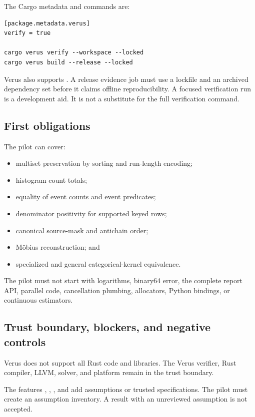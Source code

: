 \documentclass[11pt]{article}
\begin{document}
The Cargo metadata and commands are:

\begin{lstlisting}
[package.metadata.verus]
verify = true

cargo verus verify --workspace --locked
cargo verus build --release --locked
\end{lstlisting}

Verus also supports .  A release evidence job must use a lockfile and an archived
dependency set before it claims offline reproducibility.  A focused verification run is a
development aid.  It is not a substitute for the full verification command.

\subsection{First obligations}

The pilot can cover:
\begin{itemize}[leftmargin=*]
  \item multiset preservation by sorting and run-length encoding;
  \item histogram count totals;
  \item equality of event counts and event predicates;
  \item denominator positivity for supported keyed rows;
  \item canonical source-mask and antichain order;
  \item M{\"o}bius reconstruction; and
  \item specialized and general categorical-kernel equivalence.
\end{itemize}

The pilot must not start with logarithms, binary64 error, the complete report API, parallel code,
cancellation plumbing, allocators, Python bindings, or continuous estimators.

\subsection{Trust boundary, blockers, and negative controls}

Verus does not support all Rust code and libraries.  The Verus verifier, Rust compiler, LLVM,
solver, and platform remain in the trust boundary.

The features , , , and
 add assumptions or trusted specifications.  The pilot must create an assumption
inventory.  A result with an unreviewed assumption is not accepted.
\end{document}
